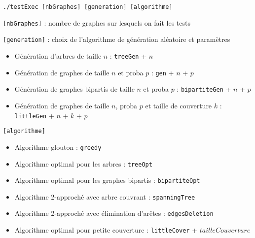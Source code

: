 \documentclass[a4paper,10pt]{article}
\newcommand*{\itemb}{\item[$\bullet$]}
\begin{document}
	\bigskip
	\texttt{./testExec [nbGraphes] [generation] [algorithme]}
	
	\bigskip
	\texttt{[nbGraphes]} : nombre de graphes sur lesquels on fait les tests
	
	\bigskip
	\texttt{[generation]} : choix de l'algorithme de génération aléatoire et paramètres 
	\begin{itemize}
			\itemb Génération d'arbres de taille $n$ : \texttt{treeGen} + $n$
			\itemb Génération de graphes de taille $n$ et proba $p$ : \texttt{gen} + $n$ + $p$
			\itemb Génération de graphes bipartis de taille $n$ et proba $p$ : \texttt{bipartiteGen} + $n$ + $p$
			\itemb Génération de graphes de taille $n$, proba $p$ et taille de couverture $k$ : \texttt{littleGen} + $n$ + $k$ + $p$
	\end{itemize}
	
	\bigskip
	\texttt{[algorithme]}
	\begin{itemize}
		\item Algorithme glouton : \texttt{greedy}
		\item Algorithme optimal pour les arbres : \texttt{treeOpt}
		\item Algorithme optimal pour les graphes bipartis : \texttt{bipartiteOpt}
		\item Algorithme 2-approché avec arbre couvrant : \texttt{spanningTree}
		\item Algorithme 2-approché avec élimination d'arêtes : \texttt{edgesDeletion}
		\item Algorithme optimal pour petite couverture : \texttt{littleCover} + $tailleCouverture$
	\end{itemize}
	
\end{document}
